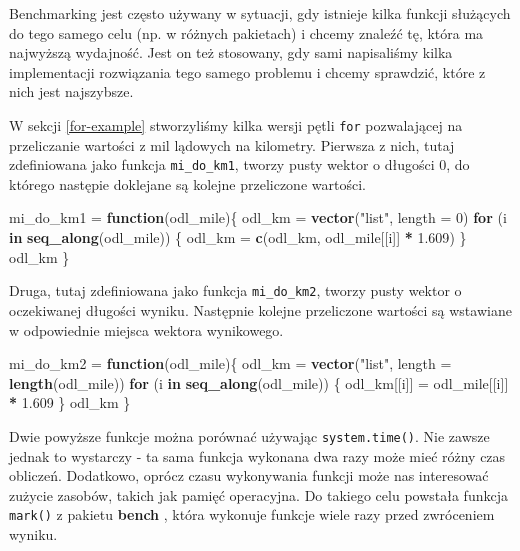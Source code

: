 \documentclass[paper=6in:9in,pagesize=pdftex,headinclude=on,footinclude=on,10pt]{scrbook}
\newenvironment{Shaded}{\begin{snugshade}}{\end{snugshade}}
\newcommand{\ControlFlowTok}[1]{\textcolor[rgb]{0.13,0.29,0.53}{\textbf{#1}}}
\newcommand{\DataTypeTok}[1]{\textcolor[rgb]{0.13,0.29,0.53}{#1}}
\newcommand{\DecValTok}[1]{\textcolor[rgb]{0.00,0.00,0.81}{#1}}
\newcommand{\FloatTok}[1]{\textcolor[rgb]{0.00,0.00,0.81}{#1}}
\newcommand{\KeywordTok}[1]{\textcolor[rgb]{0.13,0.29,0.53}{\textbf{#1}}}
\newcommand{\NormalTok}[1]{#1}
\newcommand{\OperatorTok}[1]{\textcolor[rgb]{0.81,0.36,0.00}{\textbf{#1}}}
\newcommand{\StringTok}[1]{\textcolor[rgb]{0.31,0.60,0.02}{#1}}
\begin{document}
Benchmarking jest często używany w sytuacji, gdy istnieje kilka funkcji służących do tego samego celu (np. w różnych pakietach) i chcemy znaleźć tę, która ma najwyższą wydajność.
Jest on też stosowany, gdy sami napisaliśmy kilka implementacji rozwiązania tego samego problemu i chcemy sprawdzić, które z nich jest najszybsze.

W sekcji \ref{for-example} stworzyliśmy kilka wersji pętli \texttt{for} pozwalającej na przeliczanie wartości z mil lądowych na kilometry.
Pierwsza z nich, tutaj zdefiniowana jako funkcja \texttt{mi\_do\_km1}, tworzy pusty wektor o długości 0, do którego następie doklejane są kolejne przeliczone wartości.

\begin{Shaded}
\begin{Highlighting}[]
\NormalTok{mi_do_km1 =}\StringTok{ }\ControlFlowTok{function}\NormalTok{(odl_mile)\{}
\NormalTok{  odl_km =}\StringTok{ }\KeywordTok{vector}\NormalTok{(}\StringTok{"list"}\NormalTok{, }\DataTypeTok{length =} \DecValTok{0}\NormalTok{)}
  \ControlFlowTok{for}\NormalTok{ (i }\ControlFlowTok{in} \KeywordTok{seq_along}\NormalTok{(odl_mile)) \{}
\NormalTok{    odl_km =}\StringTok{ }\KeywordTok{c}\NormalTok{(odl_km, odl_mile[[i]] }\OperatorTok{*}\StringTok{ }\FloatTok{1.609}\NormalTok{)}
\NormalTok{  \}}
\NormalTok{  odl_km}
\NormalTok{\}}
\end{Highlighting}
\end{Shaded}

Druga, tutaj zdefiniowana jako funkcja \texttt{mi\_do\_km2}, tworzy pusty wektor o oczekiwanej długości wyniku.
Następnie kolejne przeliczone wartości są wstawiane w odpowiednie miejsca wektora wynikowego.

\begin{Shaded}
\begin{Highlighting}[]
\NormalTok{mi_do_km2 =}\StringTok{ }\ControlFlowTok{function}\NormalTok{(odl_mile)\{}
\NormalTok{  odl_km =}\StringTok{ }\KeywordTok{vector}\NormalTok{(}\StringTok{"list"}\NormalTok{, }\DataTypeTok{length =} \KeywordTok{length}\NormalTok{(odl_mile))}
  \ControlFlowTok{for}\NormalTok{ (i }\ControlFlowTok{in} \KeywordTok{seq_along}\NormalTok{(odl_mile)) \{}
\NormalTok{    odl_km[[i]] =}\StringTok{ }\NormalTok{odl_mile[[i]] }\OperatorTok{*}\StringTok{ }\FloatTok{1.609}
\NormalTok{  \}}
\NormalTok{  odl_km}
\NormalTok{\}}
\end{Highlighting}
\end{Shaded}

Dwie powyższe funkcje można porównać używając \texttt{system.time()}.
Nie zawsze jednak to wystarczy - ta sama funkcja wykonana dwa razy może mieć różny czas obliczeń.
Dodatkowo, oprócz czasu wykonywania funkcji może nas interesować zużycie zasobów, takich jak pamięć operacyjna.
Do takiego celu powstała funkcja \texttt{mark()} z pakietu \textbf{bench} \citep{R-bench}, która wykonuje funkcje wiele razy przed zwróceniem wyniku.
\end{document}
